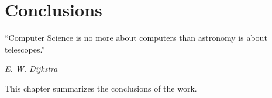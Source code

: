 \chapter{Conclusions}
\label{c:conc}

\epigraph{\enquote{Computer Science is no more about computers than astronomy is about telescopes.}}{\emph{E. W. Dijkstra}}

This chapter summarizes the conclusions of the work.
